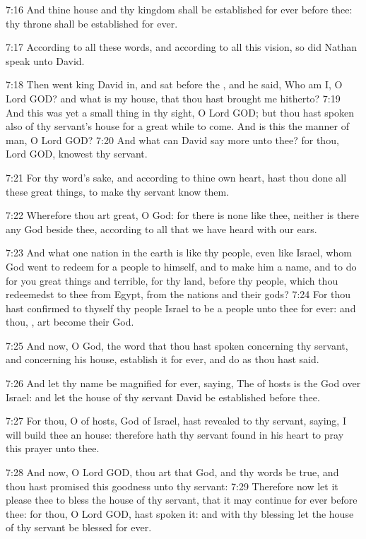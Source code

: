 7:16 And thine house and thy kingdom shall be established for ever before thee: thy throne shall be established for ever.

7:17 According to all these words, and according to all this vision, so did Nathan speak unto David.

7:18 Then went king David in, and sat before the \LORD, and he said, Who am I, O Lord GOD? and what is my house, that thou hast brought me hitherto?  7:19 And this was yet a small thing in thy sight, O Lord GOD; but thou hast spoken also of thy servant's house for a great while to come. And is this the manner of man, O Lord GOD?  7:20 And what can David say more unto thee? for thou, Lord GOD, knowest thy servant.

7:21 For thy word's sake, and according to thine own heart, hast thou done all these great things, to make thy servant know them.

7:22 Wherefore thou art great, O \LORD God: for there is none like thee, neither is there any God beside thee, according to all that we have heard with our ears.

7:23 And what one nation in the earth is like thy people, even like Israel, whom God went to redeem for a people to himself, and to make him a name, and to do for you great things and terrible, for thy land, before thy people, which thou redeemedst to thee from Egypt, from the nations and their gods?  7:24 For thou hast confirmed to thyself thy people Israel to be a people unto thee for ever: and thou, \LORD, art become their God.

7:25 And now, O \LORD God, the word that thou hast spoken concerning thy servant, and concerning his house, establish it for ever, and do as thou hast said.

7:26 And let thy name be magnified for ever, saying, The \LORD of hosts is the God over Israel: and let the house of thy servant David be established before thee.

7:27 For thou, O \LORD of hosts, God of Israel, hast revealed to thy servant, saying, I will build thee an house: therefore hath thy servant found in his heart to pray this prayer unto thee.

7:28 And now, O Lord GOD, thou art that God, and thy words be true, and thou hast promised this goodness unto thy servant: 7:29 Therefore now let it please thee to bless the house of thy servant, that it may continue for ever before thee: for thou, O Lord GOD, hast spoken it: and with thy blessing let the house of thy servant be blessed for ever.

